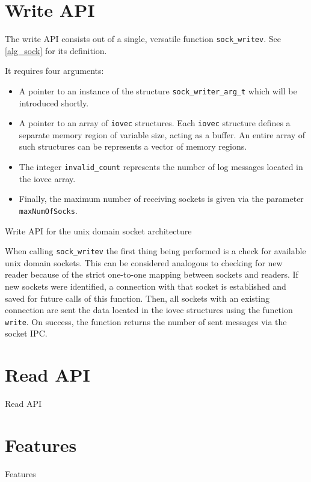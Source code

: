 \section{Write API}
The write API consists out of a single, versatile function \texttt{sock\_writev}.
See \ref{alg_sock} for its definition.

It requires four arguments:
\begin{itemize}
    \item A pointer to an instance of the structure \texttt{sock\_writer\_arg\_t} which will be introduced shortly.
    \item A pointer to an array of \texttt{iovec} structures.
            Each \texttt{iovec} structure defines a separate memory region of variable size, acting as a buffer.
            An entire array of such structures can be represents a vector of memory regions\cite{man:iovec}.
    \item The integer \texttt{invalid\_count} represents the number of log messages located in the iovec array.
    \item Finally, the maximum number of receiving sockets is given via the parameter \texttt{maxNumOfSocks}.
\end{itemize}

\begin{algorithm}[h!]
    
    \caption[Socket: Write API]{Write API for the unix domain socket architecture}
    \label{alg:sock}
\end{algorithm}

When calling \texttt{sock\_writev} the first thing being performed is a check for available unix domain sockets.
This can be considered analogous to checking for new reader because of the strict one-to-one mapping between sockets and readers.
If new sockets were identified, a connection with that socket is established and saved for future calls of this function.
Then, all sockets with an existing connection are sent the data located in the iovec structures using the function \texttt{write}.
On success, the function returns the number of sent messages via the socket IPC.

\section{Read API}
Read API

\section{Features}
Features